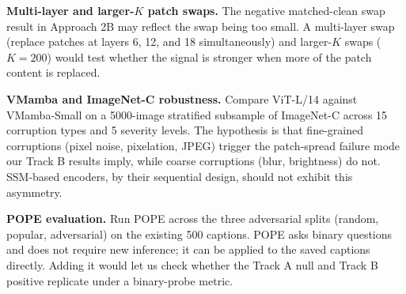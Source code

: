 \documentclass[11pt]{article}
\begin{document}
\textbf{Multi-layer and larger-$K$ patch swaps.} The negative matched-clean swap result
in Approach 2B may reflect the swap being too small. A multi-layer swap (replace
patches at layers 6, 12, and 18 simultaneously) and larger-$K$ swaps ($K = 200$) would
test whether the signal is stronger when more of the patch content is replaced.

\textbf{VMamba and ImageNet-C robustness.} Compare ViT-L/14 against VMamba-Small on a
5000-image stratified subsample of ImageNet-C across 15 corruption types and 5 severity
levels. The hypothesis is that fine-grained corruptions (pixel noise, pixelation, JPEG)
trigger the patch-spread failure mode our Track B results imply, while coarse
corruptions (blur, brightness) do not. SSM-based encoders, by their sequential design,
should not exhibit this asymmetry.

\textbf{POPE evaluation.} Run POPE across the three adversarial splits (random, popular,
adversarial) on the existing 500 captions. POPE asks binary questions and does not
require new inference; it can be applied to the saved captions directly. Adding it would
let us check whether the Track A null and Track B positive replicate under a
binary-probe metric.
\end{document}

